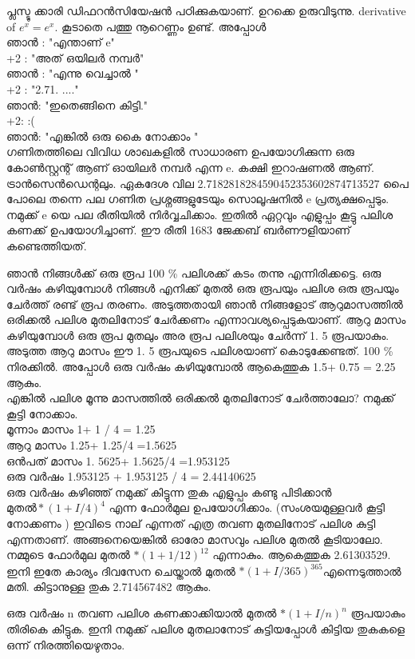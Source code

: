 \documentclass[10pt,a4paper]{report}
\begin{document}
 പ്ലസ്ടു ക്കാരി ഡിഫറൻസിയേഷൻ പഠിക്കുകയാണ്.  ഉറക്കെ ഉരുവിടുന്നു.  derivative of $ e^x = e^x$. കൂടാതെ പത്തു നൂറെണ്ണം ഉണ്ട്. അപ്പോൾ \\
  ഞാൻ : "എന്താണ്  e"\\
 +2 : "അത് ഒയിലർ നമ്പർ" \\ 
 ഞാൻ :  "എന്നു വെച്ചാൽ "\\
 +2  :   "2.71. ...."\\
 ഞാൻ: "ഇതെങ്ങിനെ കിട്ടി." \\
 +2:    :( \\
 ഞാൻ: "എങ്കിൽ ഒരു കൈ നോക്കാം " \\
    ഗണിതത്തിലെ വിവിധ ശാഖകളിൽ സാധാരണ ഉപയോഗിക്കുന്ന ഒരു കോൺസ്റ്റന്റ് ആണ്  ഓയിലർ നമ്പർ എന്ന e. കക്ഷി ഇറാഷണൽ ആണ്. ട്രാൻസെൻഡെന്റലും.  ഏകദേശ വില 2.7182818284590452353602874713527  പൈ പോലെ തന്നെ പല  ഗണിത പ്രശ്നങ്ങളുടേയും സൊലൂഷനിൽ e പ്രത്യക്ഷപ്പെടും. നമുക്ക് e യെ പല  രീതിയിൽ നിർവ്വചിക്കാം. ഇതിൽ ഏറ്റവും എളുപ്പം കൂട്ടു പലിശ കണക്ക്  ഉപയോഗിച്ചാണ്. ഈ രീതി 1683 ജേക്കബ് ബർണൗളിയാണ് കണ്ടെത്തിയത്.

 ഞാൻ നിങ്ങൾക്ക് ഒരു  രൂപ 100 \% പലിശക്ക് കടം തന്നു എന്നിരിക്കട്ടെ. ഒരു വർഷം കഴിയുമ്പോൾ നിങ്ങൾ  എനിക്ക് മുതൽ ഒരു രൂപയും പലിശ ഒരു രൂപയും ചേർത്ത് രണ്ട് രൂപ തരണം.  അടുത്തതായി ഞാൻ നിങ്ങളോട് ആറുമാസത്തിൽ ഒരിക്കൽ പലിശ മുതലിനോട് ചേർക്കണം  എന്നാവശ്യപ്പെടുകയാണ്. ആറു മാസം കഴിയുമ്പോൾ ഒരു രൂപ മുതലും അര രൂപ പലിശയും  ചേർന്ന് 1. 5 രൂപയാകും. അടുത്ത ആറു മാസം ഈ 1. 5 രൂപയുടെ പലിശയാണ്  കൊടുക്കേണ്ടത്. 100 \% നിരക്കിൽ. അപ്പോൾ ഒരു വർഷം കഴിയുമ്പോൽ ആകെത്തുക 1.5+  0.75 = 2.25 ആകും. \\
 എങ്കിൽ പലിശ  മൂന്നു മാസത്തിൽ ഒരിക്കൽ മുതലിനോട് ചേർത്താലോ? നമുക്ക് കൂട്ടി നോക്കാം.\\
 മൂന്നാം മാസം 1+ 1 / 4 = 1.25 \\
 ആറു മാസം  1.25+ 1.25/4 =1.5625 \\
 ഒൻപത് മാസം 1. 5625+ 1.5625/4 =1.953125 \\
 ഒരു വർഷം    1.953125 + 1.953125 / 4 = 2.44140625 \\
 ഒരു വർഷം കഴിഞ്ഞ് നമുക്ക് കിട്ടുന്ന തുക എളുപ്പം കണ്ടു പിടിക്കാൻ  
 $ \textbf{മുതൽ} *  (1+ I / 4) ^ 4 $ എന്ന ഫോർമുല ഉപയോഗിക്കാം. (സംശയമുള്ളവർ കൂട്ടി  നോക്കണം ) ഇവിടെ നാല് എന്നത് എത്ര തവണ  മുതലിനോട് പലിശ കുട്ടി എന്നതാണ്‌.  അങ്ങനെയെങ്കിൽ ഓരോ മാസവും പലിശ മുതൽ കൂടിയാലോ. നമ്മുടെ ഫോർമുല മുതൽ $ * (1+1/12) ^{12}$ എന്നാകും. ആകെത്തുക 2.61303529.  ഇനി ഇതേ കാര്യം ദിവസേന ചെയ്താൽ   മുതൽ $ * (1+ I / 365) ^ {365} $എന്നെടുത്താൽ മതി. കിട്ടാനുള്ള തുക 2.714567482  ആകും.
 
 
 ഒരു വർഷം n തവണ പലിശ കണക്കാക്കിയാൽ  മുതൽ $ * (1+ I / n) ^ n $ രൂപയാകും തിരികെ കിട്ടുക.
ഇനി നമുക്ക് പലിശ മുതലാനോട് കുട്ടിയപ്പോൾ കിട്ടിയ തുകകളെ ഒന്ന് നിരത്തിയെഴുതാം.
\end{document}

